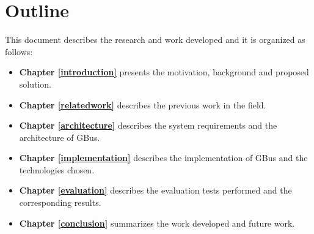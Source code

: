 \section{Outline}

This document describes the research and work developed and it is organized as follows:

\begin{itemize}
\item \textbf{Chapter \ref{introduction}} presents the motivation, background and proposed solution.
\item \textbf{Chapter \ref{relatedwork}} describes the previous work in the field.
\item \textbf{Chapter \ref{architecture}} describes the system requirements and the architecture of GBus.
\item \textbf{Chapter \ref{implementation}} describes the implementation of GBus and the technologies chosen.
\item \textbf{Chapter \ref{evaluation}} describes the evaluation tests performed and the corresponding results.
\item \textbf{Chapter \ref{conclusion}} summarizes the work developed and future work.
\end{itemize}

